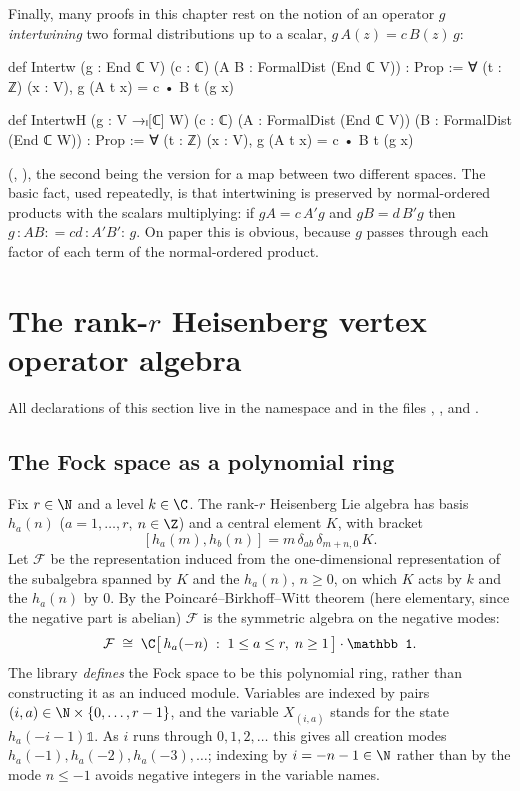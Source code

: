 Finally, many proofs in this chapter rest on the notion of an operator $g$ \emph{intertwining} two
formal distributions up to a scalar, $g\,A(z)=c\,B(z)\,g$:
\begin{leancode}
def Intertw (g : End ℂ V) (c : ℂ) (A B : FormalDist (End ℂ V)) : Prop :=
  ∀ (t : ℤ) (x : V), g (A t x) = c • B t (g x)

def IntertwH (g : V →ₗ[ℂ] W) (c : ℂ) (A : FormalDist (End ℂ V)) (B : FormalDist (End ℂ W)) :
    Prop :=
  ∀ (t : ℤ) (x : V), g (A t x) = c • B t (g x)
\end{leancode}
(, ),
the second being the version for a map between two different spaces. The basic fact, used
repeatedly, is that intertwining is preserved by normal-ordered products with the scalars
multiplying: if $gA=c\,A'g$ and $gB=d\,B'g$ then $g\,{:}AB{:}=cd\,{:}A'B'{:}\,g$. On paper this is
obvious, because $g$ passes through each factor of each term of the normal-ordered product.

\section{The rank-\texorpdfstring{$r$}{r} Heisenberg vertex operator algebra}\label{ch03:sec:heisenberg}

All declarations of this section live in the namespace  and in the files
, ,
 and .

\subsection{The Fock space as a polynomial ring}

Fix $r\in\N$ and a level $k\in\C$. The rank-$r$ Heisenberg Lie algebra has basis $h_a(n)$
($a=1,\dots,r$, $n\in\Z$) and a central element $K$, with bracket
\begin{equation}\label{ch03:eq:heisr}
  [h_a(m),h_b(n)] = m\,\delta_{ab}\,\delta_{m+n,0}\,K .
\end{equation}
Let $\mathcal F$ be the representation induced from the one-dimensional representation of the
subalgebra spanned by $K$ and the $h_a(n)$, $n\ge 0$, on which $K$ acts by $k$ and the $h_a(n)$ by
$0$. By the Poincar\'e--Birkhoff--Witt theorem (here elementary, since the negative part is
abelian) $\mathcal F$ is the symmetric algebra on the negative modes:
\begin{equation*}
  \mathcal F\;\cong\;\C\bigl[\,h_a(-n)\;:\;1\le a\le r,\;n\ge 1\,\bigr]\cdot \mathbb 1 .
\end{equation*}
The library \emph{defines} the Fock space to be this polynomial ring, rather than constructing it
as an induced module. Variables are indexed by pairs $(i,a)\in\N\times\{0,\dots,r-1\}$, and the
variable $X_{(i,a)}$ stands for the state $h_a(-i-1)\mathbb 1$. As $i$ runs through $0,1,2,\ldots$ this gives all
creation modes $h_a(-1),h_a(-2),h_a(-3),\ldots$; indexing by $i=-n-1\in\N$ rather than by the mode
$n\le-1$ avoids negative integers in the variable names.

